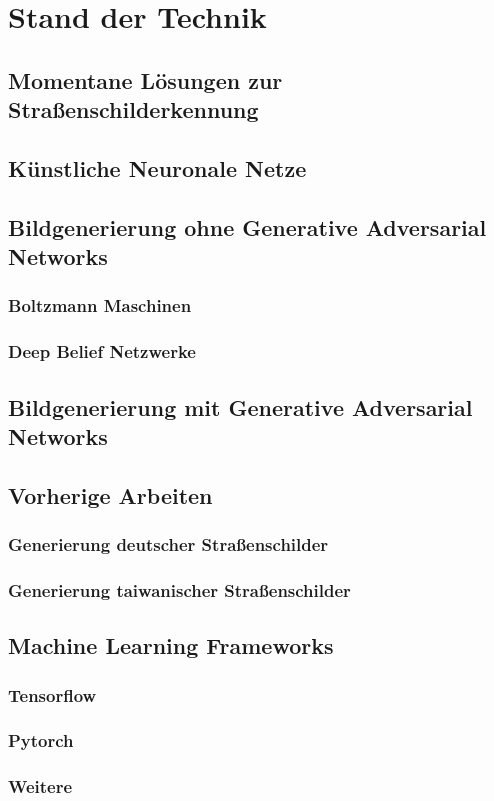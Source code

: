 \chapter{Stand der Technik}
\section{Momentane Lösungen zur Straßenschilderkennung}

\section{Künstliche Neuronale Netze}


\section{Bildgenerierung ohne Generative Adversarial Networks}
\subsection{Boltzmann Maschinen}
\subsection{Deep Belief Netzwerke}

\section{Bildgenerierung mit Generative Adversarial Networks}


\section{Vorherige Arbeiten}
\subsection{Generierung deutscher Straßenschilder}
\cite{gtsrbGAN}
\subsection{Generierung taiwanischer Straßenschilder}
\cite{taiwanGAN}

\section{Machine Learning Frameworks}
\subsection{Tensorflow}
\subsection{Pytorch}
\subsection{Weitere}